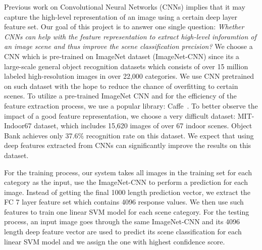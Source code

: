 
Previous work on Convolutional Neural Networks (CNNs) implies that it may
capture the high-level representation of an image using a certain deep layer
feature set. Our goal of this project is to answer one single question:
\emph{Whether CNNs can help with the feature representation to extract
high-level inforamtion of an image scene and thus improve the scene
classification precision?} We choose a CNN which is pre-trained on ImageNet
dataset (ImageNet-CNN) since its a large-scale general object recognition
datasets which consists of over 15 million labeled high-resolution images in
over 22,000 categories. We use CNN pretrained on such dataset with the hope to
reduce the chance of overfitting to certain scenes.  To utilize a pre-trained
ImageNet CNN and for the efficiency of the feature extraction process, we use
a popular library: Caffe~\cite{Jia:2014:CCA}. To better observe the impact of a good
feature representation, we choose a very difficult dataset: MIT-Indoor67 dataset,
which includes 15,620 images of over 67 indoor scenes. Object Bank achieves
only 37.6\% recognition rate on this dataset. We expect that using deep features
extracted from CNNs can significantly improve the results on this dataset.

For the training process, our system takes all images in the training set for
each category as the input, use the ImageNet-CNN to perform a prediction for
each image. Instead of getting the final 1000 length prediction vector, we
extract the FC 7 layer feature set which contains 4096 response values. We then
use such features to train one linear SVM model for each scene category. For
the testing process, an input image goes through the same ImageNet-CNN and its
4096 length deep feature vector are used to predict its scene classification
for each linear SVM model and we assign the one with highest confidence score.

